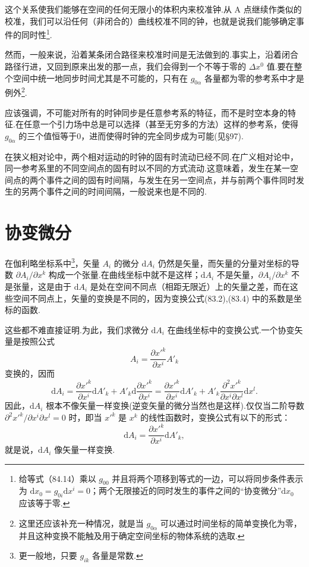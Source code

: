 这个关系使我们能够在空间的任何无限小的体积内来校准钟.从 A 点继续作类似的校准，我们可以沿任何（非闭合的）曲线校准不同的钟，也就是说我们能够确定事件的同时性\footnote{给等式（84.14）乘以 $g_{00}$ 并且将两个项移到等式的一边，可以将同步条件表示为 $\mathrm{d}x_0=g_{0i}\mathrm{d}x^i=0$；两个无限接近的同时发生的事件之间的“协变微分”$\mathrm{d}x_0$ 应该等于零.}.

然而，一般来说，沿着某条闭合路径来校准时间是无法做到的.事实上，沿着闭合路径行进，又回到原来出发的那一点，我们会得到一个不等于零的 $\Delta x^0$ 值.要在整个空间中统一地同步时间尤其是不可能的，只有在 $g_{0\alpha}$ 各量都为零的参考系中才是例外\footnote{这里还应该补充一种情况，就是当 $g_{0\alpha}$ 可以通过时间坐标的简单变换化为零，并且这种变换不能触及用于确定空间坐标的物体系统的选取.}.

应该强调，不可能对所有的时钟同步是任意参考系的特征，而不是时空本身的特征.在任意一个引力场中总是可以选择（甚至无穷多的方法）这样的参考系，使得 $g_{0\alpha}$ 的三个值恒等于0，进而使得时钟的完全同步成为可能(见§97).

在狭义相对论中，两个相对运动的时钟的固有时流动已经不同.在广义相对论中，同一参考系里的不同空间点的固有时以不同的方式流动.这意味着，发生在某一空间点的两个事件之间的固有时间隔，与发生在另一空间点，并与前两个事件同时发生的另两个事件之间的时间间隔，一般说来也是不同的.

\section{协变微分}

在伽利略坐标系中\footnote{更一般地，只要 $g_{ik}$ 各量是常数.}，矢量 $A_i$ 的微分 $\mathrm{d}A_i$ 仍然是矢量，而矢量的分量对坐标的导数 $\partial A_i/\partial x^k$ 构成一个张量.在曲线坐标中就不是这样；$\mathrm{d}A_i$ 不是矢量，$\partial A_i/\partial x^k$ 不是张量，这是由于 $\mathrm{d}A_i$ 是处在空间不同点（相距无限近）上的矢量之差，而在这些空间不同点上，矢量的变换是不同的，因为变换公式(83.2),(83.4) 中的系数是坐标的函数.

这些都不难直接证明.为此，我们求微分 $\mathrm{d}A_i$ 在曲线坐标中的变换公式.一个协变矢量是按照公式
\begin{equation*}
  A_i=\frac{\partial x'^k}{\partial x^i}A'_k
\end{equation*}
变换的，因而
\begin{equation*}
  \mathrm{d}A_i=\frac{\partial x'^k}{\partial x^i}\mathrm{d}A'_k
  +A'_k\mathrm{d}\frac{\partial x'^k}{\partial x^i}
  =\frac{\partial x'^k}{\partial x^i}\mathrm{d}A'_k
  +A'_k\frac{\partial^2 x'^k}{\partial x^i\partial x^l}\mathrm{d}x^l.
\end{equation*}
因此，$\mathrm{d}A_i$ 根本不像矢量一样变换(逆变矢量的微分当然也是这样).仅仅当二阶导数 $\partial^2 x'^k/\partial x^i\partial x^l=0$ 时，即当 $x'^k$ 是 $x^k$ 的线性函数时，变换公式有以下的形式：
\begin{equation*}
  \mathrm{d}A_i=\frac{\partial x'^k}{\partial x^i}\mathrm{d}A'_k,
\end{equation*}
就是说，$\mathrm{d}A_i$ 像矢量一样变换.

